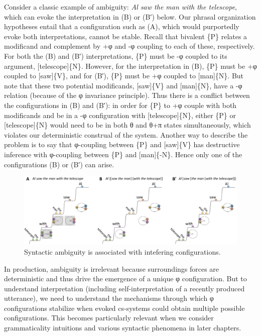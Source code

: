   Consider a classic example of ambiguity: \textit{Al saw the man with the telescope}, which can evoke the interpretation in (B) or (B′) below. Our phrasal organization hypotheses entail that a configuration such as (A), which would purportedly evoke both interpretations, cannot be stable. Recall that bivalent \{P\} relates a modificand and complement by +φ and -φ coupling to each of these, respectively. For both the (B) and (B′) interpretations, \{P\} must be -φ coupled to its argument, [telescope]\{N\}. However, for the interpretation in (B), \{P\} must be +φ coupled to [saw]\{V\}, and for (B′), \{P\} must be +φ coupled to [man]\{N\}. But note that these two potential modificands, [saw]\{V\} and [man]\{N\}, have a -φ relation (because of the φ invariance principle). Thus there is a conflict between the configurations in (B) and (B′): in order for \{P\} to +φ couple with both modificands and be in a -φ configuration with [telescope]\{N\}, either \{P\} or [telescope]\{N\} would need to be in both θ and θ+π states simultaneously, which violates our deterministic construal of the system. Another way to describe the problem is to say that φ-coupling between \{P\} and [saw]\{V\} has destructive inference with φ-coupling between \{P\} and [man]\{-N\}. Hence only one of the configurations (B) or (B′) can arise.

  
\begin{figure}
\includegraphics[width=\textwidth]{figures/Tilsen-img89.png}
\caption{Syntactic ambiguity is associated with intefering configurations.}
\label{fig:4:39}
\end{figure}
 

  In production, ambiguity is irrelevant because surroundings forces are deterministic and thus drive the emergence of a unique φ configuration. But to understand interpretation (including self-interpretation of a recently produced utterance), we need to understand the mechanisms through which φ configurations stabilize when evoked cs-systems could obtain multiple possible configurations. This becomes particularly relevant when we consider grammaticality intuitions and various syntactic phenomena in later chapters.

